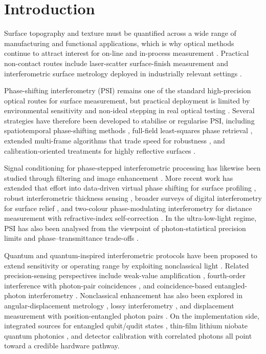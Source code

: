 \documentclass[photonics,article,submit,pdftex,moreauthors]{Definitions/mdpi}
\begin{document}
\section{Introduction}
Surface topography and texture must be quantified across a wide range of manufacturing and functional applications, which is why optical methods continue to attract interest for on-line and in-process measurement \cite{Vorburger198161,Dong201035}. Practical non-contact routes include laser-scatter surface-finish measurement \cite{Harding1992125} and interferometric surface metrology deployed in industrially relevant settings \cite{Mozer200672}.

Phase-shifting interferometry (PSI) remains one of the standard high-precision optical routes for surface measurement, but practical deployment is limited by environmental sensitivity and non-ideal stepping in real optical testing \cite{McDonnell2020}. Several strategies have therefore been developed to stabilise or regularise PSI, including spatiotemporal phase-shifting methods \cite{Ri2020}, full-field least-squares phase retrieval \cite{Medina2014}, extended multi-frame algorithms that trade speed for robustness \cite{DeGroot1997283}, and calibration-oriented treatments for highly reflective surfaces \cite{Creath1999182}.

Signal conditioning for phase-stepped interferometric processing has likewise been studied through filtering and image enhancement \cite{Younus1998600}. More recent work has extended that effort into data-driven virtual phase shifting for surface profiling \cite{Jeon2026757}, robust interferometric thickness sensing \cite{Kim2026}, broader surveys of digital interferometry for surface relief \cite{Kotsiuba2018207}, and two-colour phase-modulating interferometry for distance measurement with refractive-index self-correction \cite{Zhang2022}. In the ultra-low-light regime, PSI has also been analysed from the viewpoint of photon-statistical precision limits and phase--transmittance trade-offs \cite{Okamoto2021}.

Quantum and quantum-inspired interferometric protocols have been proposed to extend sensitivity or operating range by exploiting nonclassical light \cite{Kapale2007,Didomenico2004169}. Related precision-sensing perspectives include weak-value amplification \cite{Xu2024}, fourth-order interference with photon-pair coincidences \cite{Rarity199395}, and coincidence-based entangled-photon interferometry \cite{Richards200417}. Nonclassical enhancement has also been explored in angular-displacement metrology \cite{Jha2011}, lossy interferometry \cite{Vitelli2010}, and displacement measurement with position-entangled photon pairs \cite{Sharma2022}. On the implementation side, integrated sources for entangled qubit/qudit states \cite{Mahmudlu2023518}, thin-film lithium niobate quantum photonics \cite{Labbe2025}, and detector calibration with correlated photons \cite{Yin20221316} all point toward a credible hardware pathway.
\end{document}
